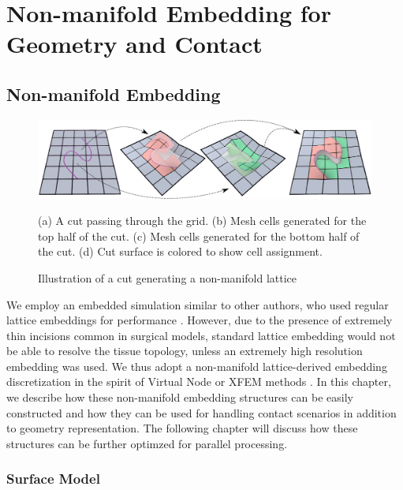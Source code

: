 \chapter{Non-manifold Embedding for Geometry and Contact}
\label{chp:nonmanifold}

\section{Non-manifold Embedding}
\label{sec:hybrid}

\begin{figure}
  \centering
  \includegraphics[width=.9\textwidth]{chapter_gridiron/images/New_HybridLattice2.pdf}
\vspace*{-.1in}
\caption{Illustration of a cut generating a non-manifold lattice}{ (a) A cut
  passing through the grid. (b) Mesh cells generated for the top half
  of the cut. (c) Mesh cells generated for the bottom half of the
  cut. (d) Cut surface is colored to show cell assignment.}
\vspace*{-.15in}
\label{Fig:MaterialContinuity}
\end{figure}

We employ an embedded simulation similar to other authors, who used
regular lattice embeddings for performance
\cite{MuellTG:2004,RiverJ:2007,McAdaZSETTS:2011}. However, due to the
presence of extremely thin incisions common in surgical models, standard
lattice embedding would not be able to resolve the tissue topology,
unless an extremely high resolution embedding was used. We thus adopt
a non-manifold lattice-derived embedding discretization in the spirit
of Virtual Node or XFEM methods
\cite{MolinBF:2004,SifakDF:2007,NesmeKJF:2009}.  In this chapter, we
describe how these non-manifold embedding structures can be easily
constructed and how they can be used for handling contact scenarios in
addition to geometry representation. The following chapter will
discuss how these structures can be further optimzed for parallel
processing.

\subsection{Surface Model}

